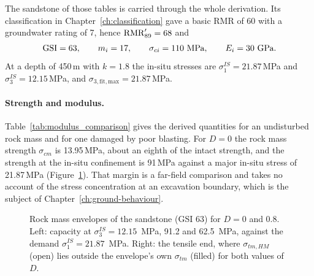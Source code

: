 The sandstone of those tables is carried through the whole
derivation. Its classification in Chapter~\ref{ch:classification} gave a basic
RMR of 60 with a groundwater rating of 7, hence \(\mathrm{RMR}'_{89} = 68\) and
\[
\mathrm{GSI} = 63,
\qquad
m_i=17,
\qquad
\sigma_{ci}=110~\text{MPa},
\qquad
E_i = 30~\text{GPa} .
\]
At a depth of 450\,m with \(k = 1.8\) the in-situ stresses are
\(\sigma_1^{IS} = 21.87\)\,MPa and \(\sigma_3^{IS} = 12.15\)\,MPa, and
\(\sigma_{3,\mathrm{fit,max}} = 21.87\)\,MPa.

\paragraph{Strength and modulus.}
Table~\ref{tab:modulus_comparison} gives the derived quantities for an
undisturbed rock mass and for one damaged by poor blasting. For \(D = 0\) the
rock mass strength \(\sigma_{cm}\) is 13.95\,MPa, about an eighth of the
intact strength, and the strength at the in-situ confinement is 91\,MPa
against a major in-situ stress of 21.87\,MPa
(Figure~\ref{fig:hb-disturbance-sandstone}). That margin is a far-field
comparison and takes no account of the stress concentration at an excavation
boundary, which is the subject of Chapter~\ref{ch:ground-behaviour}.

\begin{figure}[htbp]
\centering
{}
\caption{Rock mass envelopes of the sandstone (GSI 63) for $D = 0$ and 0.8. Left: capacity at $\sigma_3^{IS} = 12.15$~MPa, 91.2 and 62.5~MPa, against the demand $\sigma_1^{IS} = 21.87$~MPa. Right: the tensile end, where $\sigma_{tm,HM}$ (open) lies outside the envelope's own $\sigma_{tm}$ (filled) for both values of $D$.}
\label{fig:hb-disturbance-sandstone}
\end{figure}


